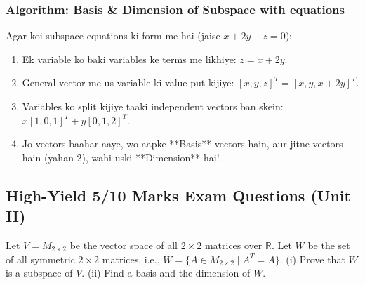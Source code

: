 \documentclass[11pt,a4paper]{article}
\begin{document}
\subsubsection{Algorithm: Basis \& Dimension of Subspace with equations}
Agar koi subspace equations ki form me hai (jaise $x+2y-z = 0$):
\begin{enumerate}
    \item Ek variable ko baki variables ke terms me likhiye: $z = x + 2y$.
    \item General vector me us variable ki value put kijiye: $[x, y, z]^T = [x, y, x+2y]^T$.
    \item Variables ko split kijiye taaki independent vectors ban skein: $x[1, 0, 1]^T + y[0, 1, 2]^T$.
    \item Jo vectors baahar aaye, wo aapke **Basis** vectors hain, aur jitne vectors hain (yahan 2), wahi uski **Dimension** hai!
\end{enumerate}

\subsection{High-Yield 5/10 Marks Exam Questions (Unit II)}

\begin{questionbox}
Let $V = M_{2 \times 2}$ be the vector space of all $2 \times 2$ matrices over $\mathbb{R}$. Let $W$ be the set of all symmetric $2 \times 2$ matrices, i.e., $W = \{ A \in M_{2 \times 2} \mid A^T = A \}$. 
(i) Prove that $W$ is a subspace of $V$. 
(ii) Find a basis and the dimension of $W$.
\end{questionbox}
\end{document}
